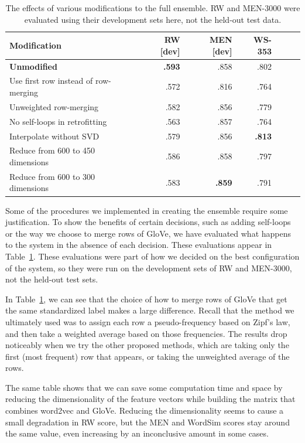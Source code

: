 \documentclass[11pt,letterpaper]{article}
\begin{document}
\begin{table}[t]
\footnotesize
\centering
\begin{tabular}{lrrrrrr}
\toprule
Modification & RW [dev] & MEN [dev] & WS-353 \\
\midrule
{\bf Unmodified}                     & \bf .593 &     .858 &     .802 \\
Use first row instead of row-merging &     .572 &     .816 &     .764 \\
Unweighted row-merging               &     .582 &     .856 &     .779 \\
No self-loops in retrofitting        &     .563 &     .857 &     .764 \\
Interpolate without SVD              &     .579 &     .856 & \bf .813 \\
Reduce from 600 to 450 dimensions    &     .586 &     .858 &     .797 \\
Reduce from 600 to 300 dimensions    &     .583 & \bf .859 &     .791 \\
\bottomrule
\end{tabular}
\caption{
    The effects of various modifications to the full ensemble.
    RW and MEN-3000 were evaluated using their development sets here,
    not the held-out test data.
}
\label{eval-variations}
\end{table}

Some of the procedures we implemented in creating the ensemble require some
justification. To show the benefits of certain decisions, such as adding
self-loops or the way we choose to merge rows of GloVe, we have evaluated what
happens to the system in the absence of each decision. These evaluations appear
in Table~\ref{eval-variations}. These evaluations were part of how we decided
on the best configuration of the system, so they were run on the development
sets of RW and MEN-3000, not the held-out test sets.

In Table~\ref{eval-variations}, we can see that the choice of how to merge rows
of GloVe that get the same standardized label makes a large difference.  Recall
that the method we ultimately used was to assign each row a pseudo-frequency
based on Zipf's law, and then take a weighted average based on those
frequencies.  The results drop noticeably when we try the other proposed
methods, which are taking only the first (most frequent) row that appears, or
taking the unweighted average of the rows.

The same table shows that we can save some computation time and space by
reducing the dimensionality of the feature vectors while building the matrix
that combines word2vec and GloVe. Reducing the dimensionality seems to cause a
small degradation in RW score, but the MEN and WordSim scores stay around the
same value, even increasing by an inconclusive amount in some cases.
\end{document}
